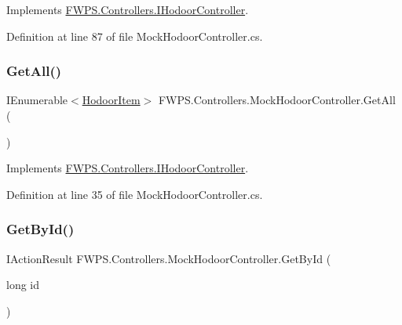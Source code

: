 Implements \mbox{\hyperlink{interface_f_w_p_s_1_1_controllers_1_1_i_hodoor_controller_a8fe985f1171b270cd663c1e16bb198ee}{F\+W\+P\+S.\+Controllers.\+I\+Hodoor\+Controller}}.



Definition at line 87 of file Mock\+Hodoor\+Controller.\+cs.

\mbox{\label{class_f_w_p_s_1_1_controllers_1_1_mock_hodoor_controller_a503cc2c82dc1892cc9c0358054b6b5df}} 
\subsubsection{\texorpdfstring{Get\+All()}{GetAll()}}
{\footnotesize\ttfamily I\+Enumerable$<$\mbox{\hyperlink{class_f_w_p_s_1_1_models_1_1_hodoor_item}{Hodoor\+Item}}$>$ F\+W\+P\+S.\+Controllers.\+Mock\+Hodoor\+Controller.\+Get\+All (\begin{DoxyParamCaption}{ }\end{DoxyParamCaption})}



Implements \mbox{\hyperlink{interface_f_w_p_s_1_1_controllers_1_1_i_hodoor_controller_ac50e7afd931ca1f16f767cac2fae488e}{F\+W\+P\+S.\+Controllers.\+I\+Hodoor\+Controller}}.



Definition at line 35 of file Mock\+Hodoor\+Controller.\+cs.

\mbox{\label{class_f_w_p_s_1_1_controllers_1_1_mock_hodoor_controller_add58a70760f00b53f829d93057e7cff0}} 
\subsubsection{\texorpdfstring{Get\+By\+Id()}{GetById()}}
{\footnotesize\ttfamily I\+Action\+Result F\+W\+P\+S.\+Controllers.\+Mock\+Hodoor\+Controller.\+Get\+By\+Id (\begin{DoxyParamCaption}\item[{long}]{id }\end{DoxyParamCaption})}



